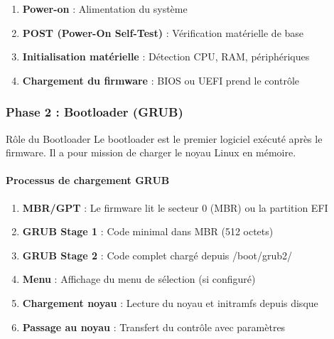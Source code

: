 \documentclass[12pt,a4paper]{article}
\begin{document}
\begin{enumerate}
    \item \textbf{Power-on} : Alimentation du système
    \item \textbf{POST (Power-On Self-Test)} : Vérification matérielle de base
    \item \textbf{Initialisation matérielle} : Détection CPU, RAM, périphériques
    \item \textbf{Chargement du firmware} : BIOS ou UEFI prend le contrôle
\end{enumerate}

\subsubsection{Phase 2 : Bootloader (GRUB)}

\begin{infobox}{Rôle du Bootloader}
Le bootloader est le premier logiciel exécuté après le firmware. Il a pour mission de charger le noyau Linux en mémoire.
\end{infobox}

\paragraph{Processus de chargement GRUB}
\begin{enumerate}
    \item \textbf{MBR/GPT} : Le firmware lit le secteur 0 (MBR) ou la partition EFI
    \item \textbf{GRUB Stage 1} : Code minimal dans MBR (512 octets)
    \item \textbf{GRUB Stage 2} : Code complet chargé depuis /boot/grub2/
    \item \textbf{Menu} : Affichage du menu de sélection (si configuré)
    \item \textbf{Chargement noyau} : Lecture du noyau et initramfs depuis disque
    \item \textbf{Passage au noyau} : Transfert du contrôle avec paramètres
\end{enumerate}
\end{document}
